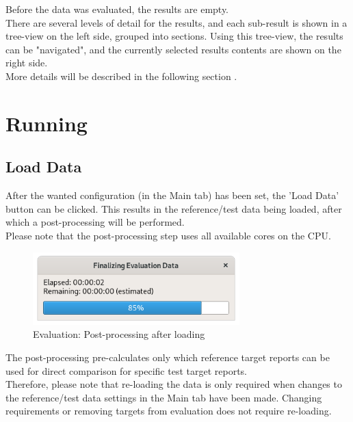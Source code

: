 Before the data was evaluated, the results are empty.\\

There are several levels of detail for the results, and each sub-result is shown in a tree-view on the left side, grouped into sections. Using this tree-view, the results can be "navigated", and the currently selected results contents are shown on the right side. \\

More details will be described in the following section .

\section{Running}
\label{sec:eval_run} 

\subsection{Load Data}
\label{sec:eval_run_load} 

After the wanted configuration (in the Main tab) has been set, the 'Load Data' button can be clicked. This results in the reference/test data being loaded, after which a post-processing will be performed. \\

Please note that the post-processing step uses all available cores on the CPU.

\begin{figure}[H]
  \centering 
    \includegraphics[width=8cm]{figures/eval_post.png}
  \caption{Evaluation: Post-processing after loading}
\end{figure}

The post-processing pre-calculates only which reference target reports can be used for direct comparison for specific test target reports. \\

Therefore, please note that re-loading the data is only required when changes to the reference/test data settings in the Main tab have been made. Changing requirements or removing targets from evaluation does not require re-loading. \\

